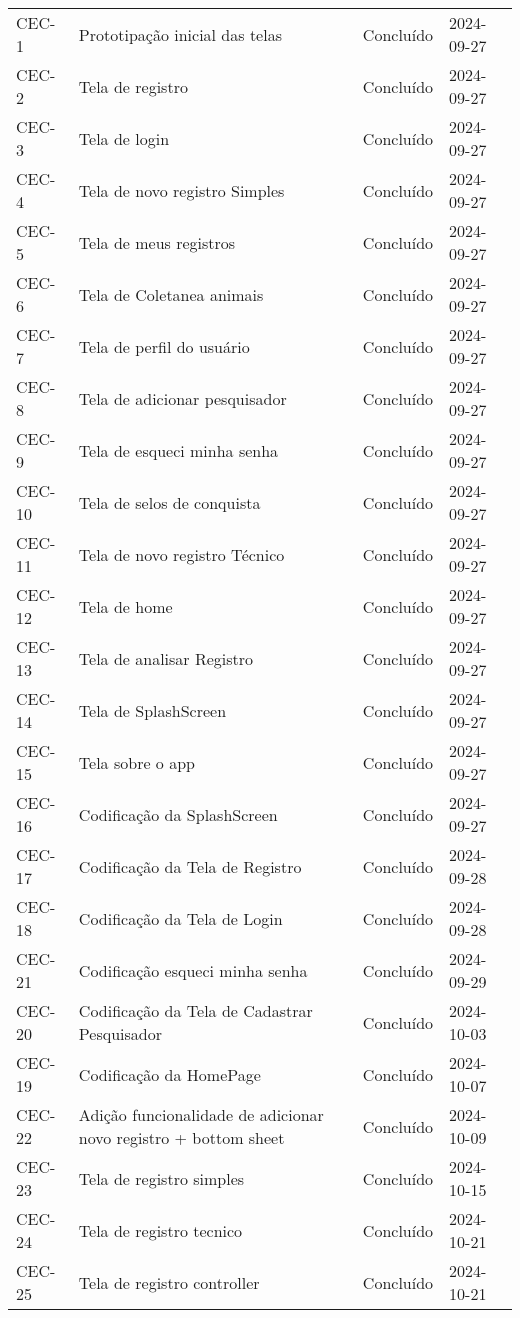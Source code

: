 \begin{longtable}{@{}lp{7cm}ll@{}}
CEC-1 & Prototipação inicial das telas & Concluído & 2024-09-27 \\
CEC-2 & Tela de registro & Concluído & 2024-09-27 \\
CEC-3 & Tela de login & Concluído & 2024-09-27 \\
CEC-4 & Tela de novo registro Simples & Concluído & 2024-09-27 \\
CEC-5 & Tela de meus registros & Concluído & 2024-09-27 \\
CEC-6 & Tela de Coletanea animais & Concluído & 2024-09-27 \\
CEC-7 & Tela de perfil do usuário & Concluído & 2024-09-27 \\
CEC-8 & Tela de adicionar pesquisador & Concluído & 2024-09-27 \\
CEC-9 & Tela de esqueci minha senha & Concluído & 2024-09-27 \\
CEC-10 & Tela de selos de conquista & Concluído & 2024-09-27 \\
CEC-11 & Tela de novo registro Técnico & Concluído & 2024-09-27 \\
CEC-12 & Tela de home & Concluído & 2024-09-27 \\
CEC-13 & Tela de analisar Registro & Concluído & 2024-09-27 \\
CEC-14 & Tela de SplashScreen & Concluído & 2024-09-27 \\
CEC-15 & Tela sobre o app & Concluído & 2024-09-27 \\
CEC-16 & Codificação da SplashScreen & Concluído & 2024-09-27 \\
CEC-17 & Codificação da Tela de Registro & Concluído & 2024-09-28 \\
CEC-18 & Codificação da Tela de Login & Concluído & 2024-09-28 \\
CEC-21 & Codificação esqueci minha senha & Concluído & 2024-09-29 \\
CEC-20 & Codificação da Tela de Cadastrar Pesquisador & Concluído & 2024-10-03 \\
CEC-19 & Codificação da HomePage & Concluído & 2024-10-07 \\
CEC-22 & Adição funcionalidade de adicionar novo registro + bottom sheet & Concluído & 2024-10-09 \\
CEC-23 & Tela de registro simples & Concluído & 2024-10-15 \\
CEC-24 & Tela de registro tecnico & Concluído & 2024-10-21 \\
CEC-25 & Tela de registro controller & Concluído & 2024-10-21 \\

\end{longtable}
